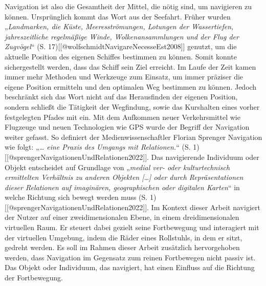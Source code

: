 Navigation ist also die Gesamtheit der Mittel, die nötig sind, um navigieren zu können. Ursprünglich kommt das Wort aus der Seefahrt. Früher wurden „\textit{Landmarken, die Küste, Meeresströmungen, Lotungen der Wassertiefen, jahreszeitliche regelmäßige Winde, Wolkenansammlungen und der Flug der Zugvögel}“ (S. 17)[[@wolfschmidtNavigareNecesseEst2008]] genutzt, um die aktuelle Position des eigenen Schiffes bestimmen zu können. Somit konnte sichergestellt werden, dass das Schiff sein Ziel erreicht. Im Laufe der Zeit kamen immer mehr Methoden und Werkzeuge zum Einsatz, um immer präziser die eigene Position ermitteln und den optimalen Weg bestimmen zu können. Jedoch beschränkt sich das Wort nicht auf das Herausfinden der eigenen Position, sondern schließt die Tätigkeit der Wegfindung, sowie das Kurshalten eines vorher festgelegten Pfades mit ein.
Mit dem Aufkommen neuer Verkehrsmittel wie Flugzeuge und neuen Technologien wie GPS wurde der Begriff der Navigation weiter gefasst. So definiert der Medienwissenschaftler Florian Sprenger Navigation wie folgt: „\textit{… eine Praxis des Umgangs mit Relationen.}“ (S. 1)[[@sprengerNavigationenUndRelationen2022]]. Das navigierende Individuum oder Objekt entscheidet auf Grundlage von „\textit{medial ver- oder kulturtechnisch ermittelten Verhältnis zu anderen Objekten […] oder durch Repräsentationen dieser Relationen auf imaginären, geographischen oder digitalen Karten}“ in welche Richtung sich bewegt werden muss (S. 1)[[@sprengerNavigationenUndRelationen2022]].
Im Kontext dieser Arbeit navigiert der Nutzer auf einer zweidimensionalen Ebene, in einem dreidimensionalen virtuellen Raum. Er steuert dabei gezielt seine Fortbewegung und interagiert mit der virtuellen Umgebung, indem die Räder eines Rollstuhls, in dem er sitzt, gedreht werden.
Es soll im Rahmen dieser Arbeit zusätzlich hervorgehoben werden, dass Navigation im Gegensatz zum reinen Fortbewegen nicht passiv ist. Das Objekt oder Individuum, das navigiert, hat einen Einfluss auf die Richtung der Fortbewegung.

